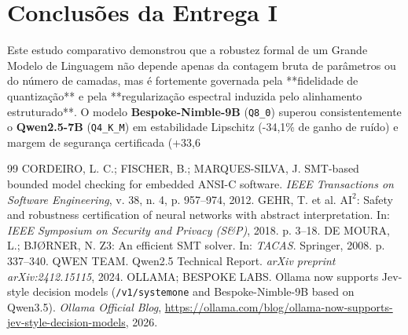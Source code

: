 \documentclass[11pt,a4paper]{article}
\theoremstyle{definition}
\begin{document}
\section{Conclusões da Entrega I}

Este estudo comparativo demonstrou que a robustez formal de um Grande Modelo de Linguagem não depende apenas da contagem bruta de parâmetros ou do número de camadas, mas é fortemente governada pela **fidelidade de quantização** e pela **regularização espectral induzida pelo alinhamento estruturado**. O modelo \textbf{Bespoke-Nimble-9B} (\texttt{Q8\_0}) superou consistentemente o \textbf{Qwen2.5-7B} (\texttt{Q4\_K\_M}) em estabilidade Lipschitz (-34,1\% de ganho de ruído) e margem de segurança certificada (+33,6%

\vspace{0.3cm}
\begin{thebibliography}{99}
 CORDEIRO, L. C.; FISCHER, B.; MARQUES-SILVA, J. SMT-based bounded model checking for embedded ANSI-C software. \textit{IEEE Transactions on Software Engineering}, v. 38, n. 4, p. 957--974, 2012.
 GEHR, T. et al. $\text{AI}^2$: Safety and robustness certification of neural networks with abstract interpretation. In: \textit{IEEE Symposium on Security and Privacy (S\&P)}, 2018. p. 3--18.
 DE MOURA, L.; BJ{\O}RNER, N. Z3: An efficient SMT solver. In: \textit{TACAS}. Springer, 2008. p. 337--340.
 QWEN TEAM. Qwen2.5 Technical Report. \textit{arXiv preprint arXiv:2412.15115}, 2024.
 OLLAMA; BESPOKE LABS. Ollama now supports Jev-style decision models (\texttt{/v1/systemone} and Bespoke-Nimble-9B based on Qwen3.5). \textit{Ollama Official Blog}, \url{https://ollama.com/blog/ollama-now-supports-jev-style-decision-models}, 2026.
\end{thebibliography}
\end{document}

